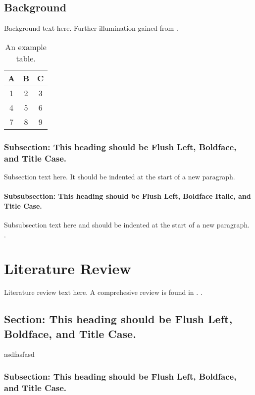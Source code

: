 \documentclass{thesis-dissertation}
\begin{document}
\section*{Background}
Background text here. Further illumination gained from \cite{johnson2021conference}.
\lipsum[3-4]
\begin{table}
  \centering
  \begin{tabular}{|c|c|c|}
    \hline
    A & B & C \\
    \hline
    1 & 2 & 3 \\
    4 & 5 & 6 \\
    7 & 8 & 9 \\
    \hline
  \end{tabular}
  \caption{An example table.}
  \label{tab:example-table}
\end{table}

\subsection*{Subsection: This heading should be Flush Left, Boldface, and Title Case.}
Subsection text here. It should be indented at the start of a new paragraph. \\
\lipsum[5-6]

\subsubsection{Subsubsection: This heading should be Flush Left, Boldface Italic, and Title Case.}
Subsubsection text here and should be indented at the start of a new paragraph. \\
\lipsum[7-8].

\subsubsection{}

\chapter{Literature Review}
Literature review text here. A comprehesive review is found in \cite{smith2022sample}. \lipsum[1-2].

\section{Section: This heading should be Flush Left, Boldface, and Title Case.}
asdfasfasd

\subsection{Subsection: This heading should be Flush Left, Boldface, and Title Case.}
\end{document}
